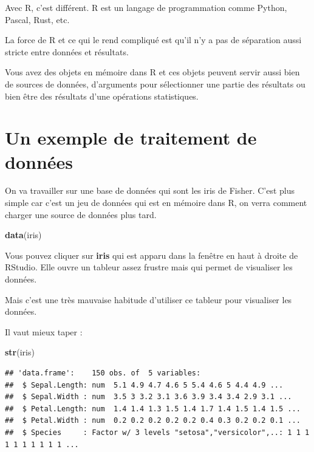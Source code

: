 \documentclass[
]{book}
\newenvironment{Shaded}{\begin{snugshade}}{\end{snugshade}}
\newcommand{\FunctionTok}[1]{\textcolor[rgb]{0.13,0.29,0.53}{\textbf{#1}}}
\newcommand{\NormalTok}[1]{#1}
\begin{document}
Avec R, c'est différent. R est un langage de programmation comme Python, Pascal,
Rust, etc.

La force de R et ce qui le rend compliqué est qu'il n'y a pas de séparation aussi
stricte entre données et résultats.

Vous avez des objets en mémoire dans R et ces objets peuvent servir aussi bien
de sources de données, d'arguments pour sélectionner une partie des résultats ou
bien être des résultats d'une opérations statistiques.

\hypertarget{un-exemple-de-traitement-de-donnuxe9es}{%
\section{Un exemple de traitement de données}\label{un-exemple-de-traitement-de-donnuxe9es}}

On va travailler sur une base de données qui sont les iris de Fisher. C'est
plus simple car c'est un jeu de données qui est en mémoire dans R, on verra
comment charger une source de données plus tard.

\begin{Shaded}
\begin{Highlighting}[]
\FunctionTok{data}\NormalTok{(iris)}
\end{Highlighting}
\end{Shaded}

Vous pouvez cliquer sur \textbf{iris} qui est apparu dans la fenêtre en haut
à droite de RStudio. Elle ouvre un tableur assez frustre mais qui permet
de visualiser les données.

Mais c'est une très mauvaise habitude d'utiliser ce tableur pour visualiser
les données.

Il vaut mieux taper :

\begin{Shaded}
\begin{Highlighting}[]
\FunctionTok{str}\NormalTok{(iris)}
\end{Highlighting}
\end{Shaded}

\begin{verbatim}
## 'data.frame':    150 obs. of  5 variables:
##  $ Sepal.Length: num  5.1 4.9 4.7 4.6 5 5.4 4.6 5 4.4 4.9 ...
##  $ Sepal.Width : num  3.5 3 3.2 3.1 3.6 3.9 3.4 3.4 2.9 3.1 ...
##  $ Petal.Length: num  1.4 1.4 1.3 1.5 1.4 1.7 1.4 1.5 1.4 1.5 ...
##  $ Petal.Width : num  0.2 0.2 0.2 0.2 0.2 0.4 0.3 0.2 0.2 0.1 ...
##  $ Species     : Factor w/ 3 levels "setosa","versicolor",..: 1 1 1 1 1 1 1 1 1 1 ...
\end{verbatim}
\end{document}
